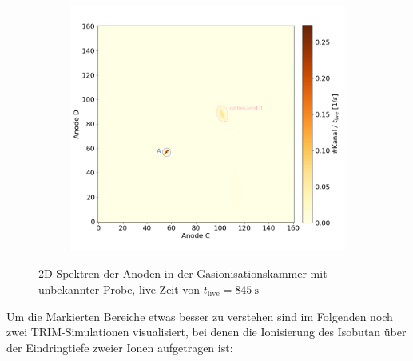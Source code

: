 \begin{figure}[H]
\begin{subfigure}{0.47\textwidth}
    \end{subfigure}
    \begin{subfigure}{0.47\textwidth}
        \centering
        \includegraphics[width=\linewidth]{Pictures/Gasdetektor/19_probe_CD.png}
    \end{subfigure}
    \caption{2D-Spektren der Anoden in der Gasionisationskammer mit unbekannter Probe, live-Zeit von $t_{\text{live}} = \SI{845}{\second}$}
    \label{Auswertung_Gasdetektor_2DSpektren_unbekannt}
\end{figure}
Um die Markierten Bereiche etwas besser zu verstehen sind im Folgenden noch zwei TRIM-Simulationen visualisiert, bei denen die Ionisierung des Isobutan über der Eindringtiefe zweier Ionen aufgetragen ist:
